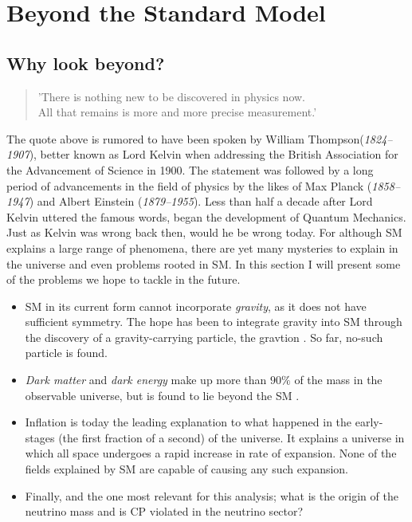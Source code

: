 \section{Beyond the Standard Model}
\subsection{Why look beyond?}
\begin{center}
    \hyphenblockcquote{UKenglish}{Kelvin}{
        'There is nothing new to be discovered in physics now.\\
        All that remains is more and more precise measurement.'
        }
\end{center}
The quote above is rumored to have been spoken by William Thompson(\emph{1824–1907}), better
known as Lord Kelvin when addressing the British Association for the Advancement
of Science in 1900. The statement was followed by a long period of advancements in the
field of physics by the likes of Max Planck (\emph{1858–1947}) and 
Albert Einstein (\emph{1879–1955}). Less than half a decade after Lord Kelvin
uttered the famous words, began the development of Quantum Mechanics. 
Just as Kelvin was wrong back then, would he be wrong today. For although \ac{SM} explains 
a large range of phenomena, there are yet many mysteries to explain in the universe and even 
problems rooted in \ac{SM}. In this section I will present some of the problems we hope to 
tackle in the future. 
\begin{itemize}
    \item \ac{SM} in its current form cannot incorporate \emph{gravity}, as it does not have sufficient symmetry. 
    The hope has been to integrate gravity into \ac{SM} through the discovery of a gravity-carrying particle, 
    the gravtion \cite{Graviton}. So far, no-such particle is found.
    \item \emph{Dark matter} and \emph{dark energy} make up more than $90\%$ of the mass in the observable universe,
    but is found to lie beyond the \ac{SM} \cite{DarkME}.
    \item Inflation is today the leading explanation to what happened in the early-stages
    (the first fraction of a second) of the universe. It explains a universe in which all space
    undergoes a rapid increase in rate of expansion. None of the fields explained by \ac{SM} are 
    capable of causing any such expansion.
    \item Finally, and the one most relevant for this analysis; what is the origin of the neutrino 
    mass and is \ac{CP} violated in the neutrino sector? 
\end{itemize}
